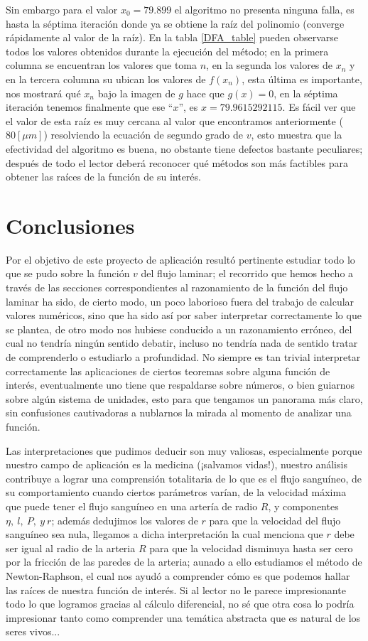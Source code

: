 Sin embargo para el valor $x_0=79.899$ el algoritmo no presenta ninguna falla, es hasta la séptima iteración donde ya se obtiene la raíz del polinomio (converge rápidamente al valor de la raíz). En la tabla \ref{DFA_table} pueden observarse todos los valores obtenidos durante la ejecución del método; en la primera columna se encuentran los valores que toma $n$, en la segunda los valores de $x_n$ y en la tercera columna su ubican los valores de $f(x_n)$, esta última es importante, nos mostrará qué $x_n$ bajo la imagen de $g$
hace que $g(x)=0$, en la séptima iteración tenemos finalmente que ese ``$x$'', es $x=79.9615292115$. Es fácil ver que el valor de esta raíz es muy cercana al valor que encontramos anteriormente ($80[\mu m]$) resolviendo la ecuación de segundo grado de $v$, esto muestra que la efectividad del algoritmo es buena, no obstante tiene defectos bastante peculiares; después de todo el lector deberá reconocer qué métodos son más factibles para obtener las raíces de la función de su interés.
\clearpage
\section{Conclusiones}
Por el objetivo de este proyecto de aplicación resultó pertinente estudiar todo lo que se pudo sobre
la función $v$ del flujo laminar; el recorrido que hemos hecho a través de las secciones correspondientes
al razonamiento de la función del flujo laminar ha sido, de cierto modo, un poco laborioso fuera del
trabajo de calcular valores numéricos, sino que ha sido así por saber interpretar correctamente lo que
se plantea, de otro modo nos hubiese conducido a un razonamiento erróneo, del cual no tendría ningún
sentido debatir, incluso no tendría nada de sentido tratar de comprenderlo o estudiarlo a profundidad.
No siempre es tan trivial interpretar correctamente las aplicaciones de ciertos teoremas sobre alguna
función de interés, eventualmente uno tiene que respaldarse sobre números, o bien guiarnos sobre algún
sistema de unidades, esto para que tengamos un panorama más claro, sin confusiones cautivadoras a
nublarnos la mirada al momento de analizar una función.

Las interpretaciones que pudimos deducir son muy valiosas, especialmente porque nuestro campo de aplicación es la medicina (¡salvamos vidas!), nuestro análisis contribuye a lograr una comprensión totalitaria de lo que es el flujo sanguíneo, de su comportamiento cuando ciertos parámetros varían, de la velocidad máxima que puede tener el flujo sanguíneo en una artería de radio $R$, y componentes $\eta, \ l, \ P,\ y \ r$; además dedujimos los valores de $r$ para que la velocidad del flujo sanguíneo sea nula, llegamos a dicha interpretación la cual menciona que $r$ debe ser igual al radio de la arteria $R$ para que la velocidad disminuya hasta ser cero por la fricción de las paredes de la arteria; aunado a ello estudiamos el método de Newton-Raphson, el cual nos ayudó a comprender cómo es que podemos hallar las raíces de nuestra función de interés. Si al lector no le parece impresionante todo lo que logramos gracias al cálculo diferencial, no sé que otra cosa lo podría impresionar tanto como comprender una temática abstracta que es natural de los seres vivos...